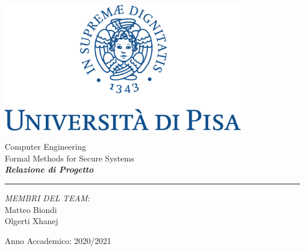 \documentclass[12pt]{article}
\begin{document}
	
	
	\begin{titlepage}
		\begin{center}
			
			\begin{center}
				\includegraphics[width=0.8\textwidth]{img/marchio_unipi_pant541-eps-converted-to.pdf}         
			\end{center}
			{\Large
				\vspace{15mm}
				Computer Engineering\\
				\vspace{5mm}
				Formal Methods for Secure Systems}\\
			\vspace{30mm} 
			{\Huge\textbf{\textit{Relazione di Progetto}}}\\
			\vspace{70mm} 
			\par\noindent\rule{\textwidth}{0.4pt}
			\begin{flushright}
				\textit{MEMBRI DEL TEAM}:\\
				Matteo Biondi\\
				Olgerti Xhanej\\
			\end{flushright}
			\vfill
			Anno Accademico: 2020/2021\\        
		\end{center}
	\end{titlepage} 
	\tableofcontents
	
	
		
	
	
	
\end{document}
